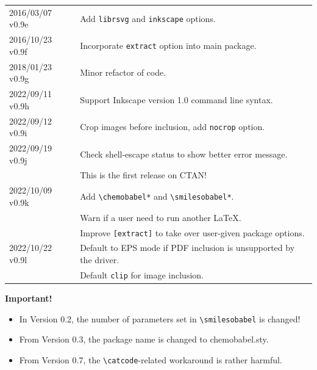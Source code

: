 \documentclass[12pt]{ltjsarticle}
\def\Lpack#1{\textsf{#1}}
\begin{document}
\begin{table}[h]
\begin{tabular}{ll}
2016/03/07 v0.9e & Add \verb|librsvg| and \verb|inkscape| options. \\
2016/10/23 v0.9f & Incorporate \verb|extract| option into main package. \\
2018/01/23 v0.9g & Minor refactor of code. \\
2022/09/11 v0.9h & Support Inkscape version 1.0 command line syntax. \\
2022/09/12 v0.9i & Crop images before inclusion, add \verb|nocrop| option. \\
2022/09/19 v0.9j & Check shell-escape status to show better error message. \\
                 & This is the first release on CTAN! \\
2022/10/09 v0.9k & Add \verb|\chemobabel*| and \verb|\smilesobabel*|. \\
                 & Warn if a user need to run another \LaTeX. \\
                 & Improve \verb|[extract]| to take over user-given package options. \\
2022/10/22 v0.9l & Default to EPS mode if PDF inclusion is unsupported by the driver. \\
                 & Default \verb|clip| for image inclusion. \\
\end{tabular}
\end{table}

\textbf{Important!}
\begin{itemize}
\item In Version 0.2, the number of parameters set in \verb|\smilesobabel| is changed!
\item From Version 0.3, the package name is changed to \Lpack{chemobabel.sty}.
\item From Version 0.7, the \verb|\catcode|-related workaround is rather harmful.
\end{itemize}

\clearpage
\end{document}
